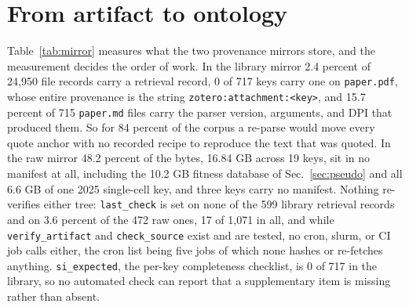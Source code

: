 
\section{From artifact to ontology}\label{sec:pipeline}



Table~\ref{tab:mirror} measures what the two provenance mirrors store, and the measurement
decides the order of work. In the library mirror 2.4 percent of 24,950 file records carry a
retrieval record, 0 of 717 keys carry one on \texttt{paper.pdf}, whose entire provenance is the
string \texttt{zotero:attachment:<key>}, and 15.7 percent of 715 \texttt{paper.md} files carry
the parser version, arguments, and DPI that produced them. So for 84 percent of the corpus a
re-parse would move every quote anchor with no recorded recipe to reproduce the text that was
quoted. In the raw mirror 48.2 percent of the bytes, 16.84 GB across 19 keys, sit in no
manifest at all, including the 10.2 GB fitness database of Sec.~\ref{sec:pseudo} and all 6.6 GB
of one 2025 single-cell key, and three keys carry no manifest. Nothing re-verifies either tree:
\texttt{last\_check} is set on none of the 599 library retrieval records and on 3.6 percent of
the 472 raw ones, 17 of 1,071 in all, and while \texttt{verify\_artifact} and
\texttt{check\_source} exist and are tested, no
cron, slurm, or CI job calls either, the cron list being five jobs of which none hashes or
re-fetches anything. \texttt{si\_expected}, the per-key completeness checklist, is 0 of 717 in
the library, so no automated check can report that a supplementary item is missing rather than
absent.

